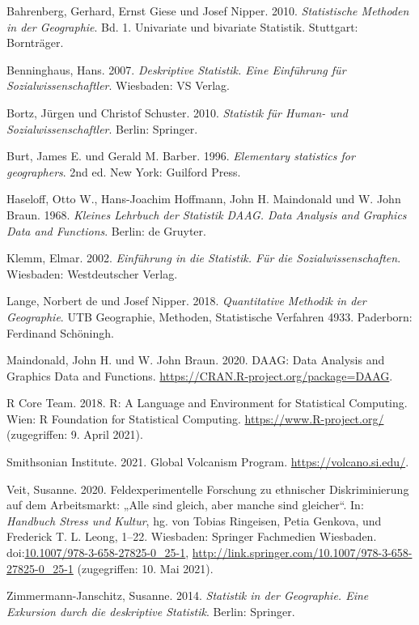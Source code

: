 \documentclass[
  11pt,
  ngerman,
  a4paper,
]{report}
\newlength{\cslhangindent}
\newenvironment{CSLReferences}[2] %
 {%
  \setlength{\parindent}{0pt}
  \ifodd #1 \everypar{\setlength{\hangindent}{\cslhangindent}}\ignorespaces\fi
  \ifnum #2 > 0
  \setlength{\parskip}{#2\baselineskip}
  \fi
 }%
 {}
\begin{document}
\hypertarget{refs}{}
\begin{CSLReferences}{1}{0}
\leavevmode{}%
Bahrenberg, Gerhard, Ernst Giese und Josef Nipper. 2010. \emph{Statistische Methoden in der Geographie}. Bd. 1. Univariate und bivariate Statistik. Stuttgart: Bornträger.

\leavevmode{}%
Benninghaus, Hans. 2007. \emph{Deskriptive Statistik. Eine Einführung für Sozialwissenschaftler}. Wiesbaden: VS Verlag.

\leavevmode{}%
Bortz, Jürgen und Christof Schuster. 2010. \emph{Statistik für Human- und Sozialwissenschaftler}. Berlin: Springer.

\leavevmode{}%
Burt, James E. und Gerald M. Barber. 1996. \emph{Elementary statistics for geographers}. 2nd ed. New York: Guilford Press.

\leavevmode{}%
Haseloff, Otto W., Hans-Joachim Hoffmann, John H. Maindonald und W. John Braun. 1968. \emph{Kleines Lehrbuch der Statistik DAAG. Data Analysis and Graphics Data and Functions}. Berlin: de Gruyter.

\leavevmode{}%
Klemm, Elmar. 2002. \emph{Einführung in die Statistik. Für die Sozialwissenschaften}. Wiesbaden: Westdeutscher Verlag.

\leavevmode{}%
Lange, Norbert de und Josef Nipper. 2018. \emph{Quantitative Methodik in der Geographie}. {UTB} Geographie, Methoden, Statistische Verfahren 4933. Paderborn: Ferdinand Schöningh.

\leavevmode{}%
Maindonald, John H. und W. John Braun. 2020. DAAG: Data Analysis and Graphics Data and Functions. \url{https://CRAN.R-project.org/package=DAAG}.

\leavevmode{}%
R Core Team. 2018. R: A Language and Environment for Statistical Computing. Wien: R Foundation for Statistical Computing. \url{https://www.R-project.org/} (zugegriffen: 9. April 2021).

\leavevmode{}%
Smithsonian Institute. 2021. Global Volcanism Program. \url{https://volcano.si.edu/}.

\leavevmode{}%
Veit, Susanne. 2020. Feldexperimentelle {Forschung} zu ethnischer {Diskriminierung} auf dem {Arbeitsmarkt}: „{Alle} sind gleich, aber manche sind gleicher``. In: \emph{Handbuch {Stress} und {Kultur}}, hg. von Tobias Ringeisen, Petia Genkova, und Frederick T. L. Leong, 1--22. Wiesbaden: Springer Fachmedien Wiesbaden. doi:\href{https://doi.org/10.1007/978-3-658-27825-0_25-1}{10.1007/978-3-658-27825-0\_25-1}, \url{http://link.springer.com/10.1007/978-3-658-27825-0_25-1} (zugegriffen: 10. Mai 2021).

\leavevmode{}%
Zimmermann-Janschitz, Susanne. 2014. \emph{Statistik in der Geographie. Eine Exkursion durch die deskriptive Statistik}. Berlin: Springer.

\end{CSLReferences}
\end{document}
